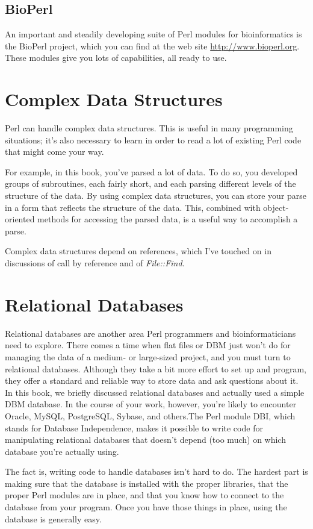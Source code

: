 \subsection{BioPerl}
An important and steadily developing suite of Perl modules for bioinformatics is the BioPerl project, which you can find at the web site \href{http://www.bioperl.org}{http://www.bioperl.org}. These modules give you lots of capabilities, all ready to use.

\section{Complex Data Structures}
Perl can handle complex data structures. This is useful in many programming situations; it's also necessary to learn in order to read a lot of existing Perl code that might come your way.

For example, in this book, you've parsed a lot of data. To do so, you developed groups of subroutines, each fairly short, and each parsing different levels of the structure of the data. By using complex data structures, you can store your parse in a form that reflects the structure of the data. This, combined with object-oriented methods for accessing the parsed data, is a useful way to accomplish a parse.

Complex data structures depend on references, which I've touched on in discussions of call by reference and of \textit{File::Find}.

\section{Relational Databases}
Relational databases are another area Perl programmers and bioinformaticians need to explore. There comes a time when flat files or DBM just won't do for managing the data of a medium- or large-sized project, and you must turn to relational databases. Although they take a bit more effort to set up and program, they offer a standard and reliable way to store data and ask questions about it. In this book, we briefly discussed relational databases and actually used a simple DBM database. In the course of your work, however, you're likely to encounter Oracle, MySQL, PostgreSQL, Sybase, and others.The Perl module DBI, which stands for Database Independence, makes it possible to write code for manipulating relational databases that doesn't depend (too much) on which database you're actually using.

The fact is, writing code to handle databases isn't hard to do. The hardest part is making sure that the database is installed with the proper libraries, that the proper Perl modules are in place, and that you know how to connect to the database from your program. Once you have those things in place, using the database is generally easy.


